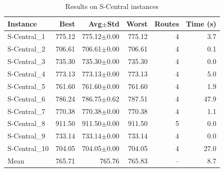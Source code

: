 \begin{table}[htbp]
\centering
\caption{Results on S-Central instances}
\label{tab:s-central}
\begin{tabular}{lrrrrr}
\toprule
Instance & Best & Avg$\pm$Std & Worst & Routes & Time (s) \\
\midrule
S-Central_1 & 775.12 & 775.12$\pm$0.00 & 775.12 & 4 & 3.7 \\
S-Central_2 & 706.61 & 706.61$\pm$0.00 & 706.61 & 4 & 0.1 \\
S-Central_3 & 735.30 & 735.30$\pm$0.00 & 735.30 & 4 & 0.0 \\
S-Central_4 & 773.13 & 773.13$\pm$0.00 & 773.13 & 4 & 5.0 \\
S-Central_5 & 761.60 & 761.60$\pm$0.00 & 761.60 & 4 & 1.9 \\
S-Central_6 & 786.24 & 786.75$\pm$0.62 & 787.51 & 4 & 47.9 \\
S-Central_7 & 770.38 & 770.38$\pm$0.00 & 770.38 & 4 & 1.1 \\
S-Central_8 & 911.50 & 911.50$\pm$0.00 & 911.50 & 5 & 0.0 \\
S-Central_9 & 733.14 & 733.14$\pm$0.00 & 733.14 & 4 & 0.0 \\
S-Central_10 & 704.05 & 704.05$\pm$0.00 & 704.05 & 4 & 27.0 \\
\midrule
Mean & 765.71 & 765.76 & 765.83 & -- & 8.7 \\
\bottomrule
\end{tabular}
\end{table}